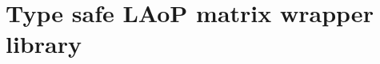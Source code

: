 \documentclass[
  oneside,
  11pt, a4paper,
  footinclude=true,
  headinclude=true,
  cleardoublepage=empty
]{scrbook}
\theoremstyle{definition}
\theoremstyle{definition}
\begin{document}
    

	

	
	
	
	\chapter{Type safe LAoP matrix wrapper library}\label{appendix-a}
	
\end{document}
